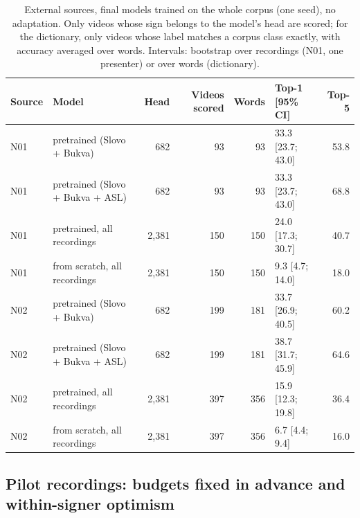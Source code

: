 \documentclass[a4paper,fleqn]{cas-dc}
\begin{document}
\begin{table}[t]
\caption{External sources, final models trained on the whole corpus (one seed), no adaptation. Only videos whose sign belongs to the model's head are scored; for the dictionary, only videos whose label matches a corpus class exactly, with accuracy averaged over words. Intervals: bootstrap over recordings (N01, one presenter) or over words (dictionary).}\label{tab:external}
\footnotesize
\centering
\begin{tabular}{llrrrlr}
\toprule
\textbf{Source} & \textbf{Model} & \textbf{Head} & \textbf{Videos scored} & \textbf{Words} & \textbf{Top-1 [95\% CI]} & \textbf{Top-5} \\
\midrule
N01 & pretrained (Slovo + Bukva) & 682 & 93 & 93 & 33.3 [23.7; 43.0] & 53.8 \\
N01 & pretrained (Slovo + Bukva + ASL) & 682 & 93 & 93 & 33.3 [23.7; 43.0] & 68.8 \\
N01 & pretrained, all recordings & 2,381 & 150 & 150 & 24.0 [17.3; 30.7] & 40.7 \\
N01 & from scratch, all recordings & 2,381 & 150 & 150 & 9.3 [4.7; 14.0] & 18.0 \\
N02 & pretrained (Slovo + Bukva) & 682 & 199 & 181 & 33.7 [26.9; 40.5] & 60.2 \\
N02 & pretrained (Slovo + Bukva + ASL) & 682 & 199 & 181 & 38.7 [31.7; 45.9] & 64.6 \\
N02 & pretrained, all recordings & 2,381 & 397 & 356 & 15.9 [12.3; 19.8] & 36.4 \\
N02 & from scratch, all recordings & 2,381 & 397 & 356 & 6.7 [4.4; 9.4] & 16.0 \\
\bottomrule
\end{tabular}
\end{table}

\hypertarget{pilot-recordings-budgets-fixed-in-advance-and-within-signer-optimism}{%
\subsection{Pilot recordings: budgets fixed in advance and within-signer optimism}\label{pilot-recordings-budgets-fixed-in-advance-and-within-signer-optimism}}
\end{document}

